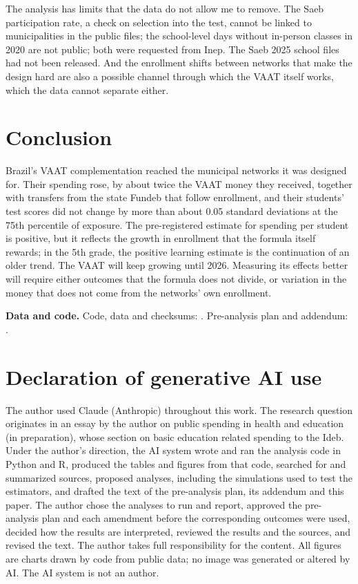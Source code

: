 \documentclass[11pt]{article}
\begin{document}
The analysis has limits that the data do not allow me to remove. The Saeb participation rate, a check on selection into the test, cannot be linked to municipalities in the public files; the school-level days without in-person classes in 2020 are not public; both were requested from Inep. The Saeb 2025 school files had not been released. And the enrollment shifts between networks that make the design hard are also a possible channel through which the VAAT itself works, which the data cannot separate either.

\section{Conclusion}\label{sec:conclusao}

Brazil's VAAT complementation reached the municipal networks it was designed for. Their spending rose, by about twice the VAAT money they received, together with transfers from the state Fundeb that follow enrollment, and their students' test scores did not change by more than about 0.05 standard deviations at the 75th percentile of exposure. The pre-registered estimate for spending per student is positive, but it reflects the growth in enrollment that the formula itself rewards; in the 5th grade, the positive learning estimate is the continuation of an older trend. The VAAT will keep growing until 2026. Measuring its effects better will require either outcomes that the formula does not divide, or variation in the money that does not come from the networks' own enrollment.

\bigskip
\noindent\textbf{Data and code.} Code, data and checksums: \citet{cunha2026a}. Pre-analysis plan and addendum: \citet{cunha2026pap,cunha2026add}.

\section*{Declaration of generative AI use}
The author used Claude (Anthropic) throughout this work. The research question originates in an essay by the author on public spending in health and education (in preparation), whose section on basic education related spending to the Ideb. Under the author's direction, the AI system wrote and ran the analysis code in Python and R, produced the tables and figures from that code, searched for and summarized sources, proposed analyses, including the simulations used to test the estimators, and drafted the text of the pre-analysis plan, its addendum and this paper. The author chose the analyses to run and report, approved the pre-analysis plan and each amendment before the corresponding outcomes were used, decided how the results are interpreted, reviewed the results and the sources, and revised the text. The author takes full responsibility for the content. All figures are charts drawn by code from public data; no image was generated or altered by AI. The AI system is not an author.
\end{document}
